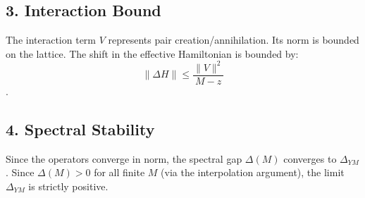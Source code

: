 \subsection{3. Interaction Bound}
The interaction term $V$ represents pair creation/annihilation. Its norm is bounded on the lattice. The shift in the effective Hamiltonian is bounded by:
\begin{equation}
\| \Delta H \| \le \frac{\|V\|^2}{M - z}
\end{equation}.

\subsection{4. Spectral Stability}
Since the operators converge in norm, the spectral gap $\Delta(M)$ converges to $\Delta_{YM}$. Since $\Delta(M) > 0$ for all finite $M$ (via the interpolation argument), the limit $\Delta_{YM}$ is strictly positive.



